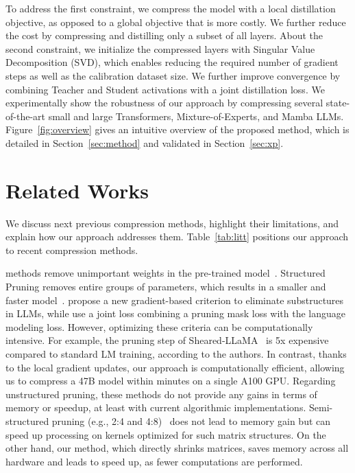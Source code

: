 \documentclass[11pt]{article}
\begin{document}
To address the first constraint, we compress the model with a local distillation objective, as opposed to a global objective that is more costly. We further reduce the cost by compressing and distilling only a subset of all layers.
About the second constraint, we initialize the compressed layers with Singular Value Decomposition (SVD), which enables 
reducing the required number of gradient steps as well as the calibration dataset size. We further improve convergence by combining Teacher and Student activations with a joint distillation loss. 
We experimentally show the robustness of our approach by compressing several state-of-the-art small and large Transformers, Mixture-of-Experts, and Mamba LLMs.
Figure~\ref{fig:overview} gives an intuitive overview of the proposed method, which is detailed in Section~\ref{sec:method} and validated in Section~\ref{sec:xp}.

\section{Related Works}
We discuss next previous compression methods, highlight their limitations, and explain how our approach addresses them. Table~\ref{tab:litt} positions our approach to recent compression methods.

 methods remove unimportant weights in the pre-trained model~\citep{NIPS1989_6c9882bb,han2015learning}. Structured Pruning removes entire groups of parameters, which results in a smaller and faster model~\citep{xia2024sheared,ma2023llmpruner}. \citet{ma2023llmpruner} propose a new gradient-based criterion to eliminate substructures in LLMs, while \citet{xia2024sheared} use a joint loss combining a pruning mask loss with the language modeling loss. However, optimizing these criteria can be computationally intensive. For example, the pruning step of Sheared-LLaMA~\citep{xia_sheared_2023} is 5x expensive compared to standard LM training, according to the authors. In contrast, thanks to the local gradient updates, our approach is computationally efficient, allowing us to compress a 47B model within minutes on a single A100 GPU. Regarding unstructured pruning, these methods do not provide any gains in terms of memory or speedup, at least with current algorithmic implementations. Semi-structured pruning (e.g., 2:4 and 4:8)~\citep{wanda, frantar2023sparsegptmassivelanguagemodels, TEAL} does not lead to memory gain but can speed up processing on kernels optimized for such matrix structures. On the other hand, our method, which directly shrinks matrices, saves memory across all hardware and leads to speed up, as fewer computations are performed.
\end{document}
